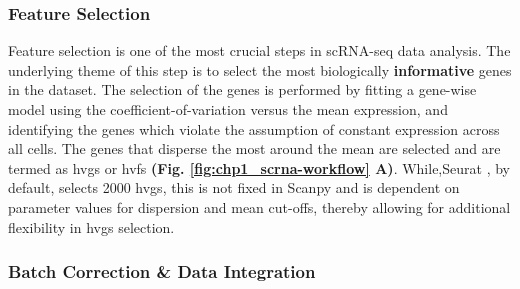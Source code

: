 \subsubsection{Feature Selection}
Feature selection is one of the most crucial steps in scRNA-seq data analysis. The underlying theme of this step is to select the most biologically \textbf{informative} genes in the dataset. The selection of the genes is performed by fitting a gene-wise model using the coefficient-of-variation versus the mean expression, and identifying the genes which violate the assumption of constant expression across all cells. The genes that disperse the most around the mean are selected and are termed as \glspl{hvg} or \glspl{hvf} \textbf{(Fig. \ref{fig:chp1_scrna-workflow} A)}. %
While,Seurat \textbf{\cite{butler_integrating_2018,stuart_comprehensive_2019,hao_integrated_2021}}, by default, selects 2000 \glspl{hvg}, this is not fixed in Scanpy \textbf{\cite{wolf_scanpy_2018}} and is dependent on parameter values for dispersion and mean cut-offs, thereby allowing for additional flexibility in \glspl{hvg} selection.

\subsubsection{Batch Correction \& Data Integration}

